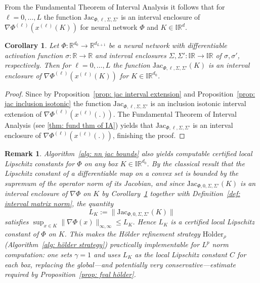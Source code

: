 \documentclass[a4paper, 11pt]{article}
\newtheorem{corollary}[theorem]{Corollary}
\newtheorem{remark}[theorem]{Remark}
\begin{document}
	From the Fundamental Theorem of Interval Analysis it follows that for $\ell=0,\dotsc,L$ the function $\mathrm{Jac}_{\Phi,\ell, \Sigma, \Sigma'}$ is an interval enclosure of $\nabla\Phi^{(\ell)}(x^{(\ell)}(K))$ for neural network $\Phi$ and $K \in \mathbb{IR}^d$.
	
	\begin{corollary}\label{cor: jac int encl}
		Let $\Phi : \mathbb{R}^{d_0} \to \mathbb{R}^{d_{L+1}}$ be a neural network with differentiable activation function $\sigma : \mathbb{R} \to \mathbb{R}$ and interval enclosures $\Sigma,\Sigma':\mathbb{IR}\to \mathbb{IR}$ of $\sigma,\sigma'$, respectively. Then for $\ell=0,\dotsc,L$ the function $\mathrm{Jac}_{\Phi,\ell, \Sigma, \Sigma'}(K)$ is an interval enclosure of $\nabla\Phi^{(\ell)}(x^{(\ell)}(K))$ for $K\in \mathbb{IR}^{d_0}$.
	\end{corollary}
	\begin{proof}
		Since by Proposition~\ref{prop: jac interval extension} and Proposition~\ref{prop: jac inclusion isotonic} the function $\mathrm{Jac}_{\Phi,\ell, \Sigma, \Sigma'}$ is an inclusion isotonic interval extension of $\nabla\Phi^{(\ell)}(x^{(\ell)}(.))$. The Fundamental Theorem of Interval Analysis (see \ref{thm: fund thm of IA}) yields that $\mathrm{Jac}_{\Phi,\ell, \Sigma, \Sigma'}$ is an interval enclosure of $\nabla\Phi^{(\ell)}(x^{(\ell)}(.))$, finishing the proof.
	\end{proof}

    \begin{remark}\label{rem: local lipschitz from jac}
		Algorithm~\ref{alg: nn jac bounds} also yields computable certified local Lipschitz constants for $\Phi$ on any box $K \in \mathbb{IR}^{d_0}$. By the classical result that the Lipschitz constant of a differentiable map on a convex set is bounded by the supremum of the operator norm of its Jacobian, and since $\mathrm{Jac}_{\Phi,0,\Sigma,\Sigma'}(K)$ is an interval enclosure of $\nabla\Phi$ on $K$ by Corollary~\ref{cor: jac int encl} together with Definition~\ref{def: interval matrix norm}, the quantity
		$$L_K := \|\mathrm{Jac}_{\Phi,0,\Sigma,\Sigma'}(K)\|$$
		satisfies $\sup_{x \in K}\|\nabla\Phi(x)\|_{\infty,\infty} \leq L_K$.
		Hence $L_K$ is a certified local Lipschitz constant of $\Phi$ on $K$.
		This makes the Hölder refinement strategy $\mathrm{H\ddot{o}lder}_\rho$ (Algorithm~\ref{alg: hölder strategy}) practically implementable for $L^{p}$ norm computation: one sets $\gamma = 1$ and uses $L_K$ as the local Lipschitz constant $C$ for each box, replacing the global---and potentially very conservative---estimate required by Proposition~\ref{prop: fval hölder}.
	\end{remark}
    
\end{document}
